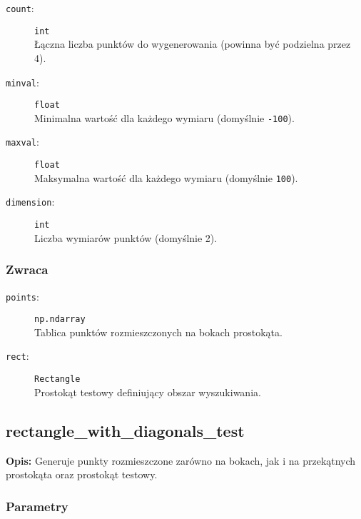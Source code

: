 \documentclass[12pt]{article}
\begin{document}
\begin{description}
    \item[\texttt{count}:] \texttt{int} \\
    Łączna liczba punktów do wygenerowania (powinna być podzielna przez 4).
    
    \item[\texttt{minval}:] \texttt{float} \\
    Minimalna wartość dla każdego wymiaru (domyślnie \texttt{-100}).
    
    \item[\texttt{maxval}:] \texttt{float} \\
    Maksymalna wartość dla każdego wymiaru (domyślnie \texttt{100}).
    
    \item[\texttt{dimension}:] \texttt{int} \\
    Liczba wymiarów punktów (domyślnie 2).
\end{description}

\subsubsection{Zwraca}

\begin{description}
    \item[\texttt{points}:] \texttt{np.ndarray} \\
    Tablica punktów rozmieszczonych na bokach prostokąta.
    
    \item[\texttt{rect}:] \texttt{Rectangle} \\
    Prostokąt testowy definiujący obszar wyszukiwania.
\end{description}

\subsection{rectangle\_with\_diagonals\_test}

\textbf{Opis:} Generuje punkty rozmieszczone zarówno na bokach, jak i na przekątnych prostokąta oraz prostokąt testowy.

\subsubsection{Parametry}
\end{document}
